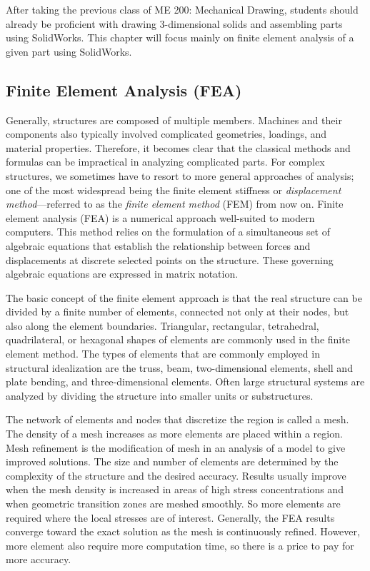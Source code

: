 \documentclass[a4paper,openany,nobib]{tufte-book}
\begin{document}
{{After taking the previous class of ME 200: Mechanical Drawing, students
should already be proficient with drawing 3-dimensional solids and
assembling parts using SolidWorks. This chapter will focus mainly on
finite element analysis of a given part using SolidWorks.

\subsection{Finite Element Analysis (FEA)}
\label{finite-element-analysis-fea}
Generally, structures are composed of multiple members. Machines and
their components also typically involved complicated geometries,
loadings, and material properties. Therefore, it becomes clear that the
classical methods and formulas can be impractical in analyzing
complicated parts. For complex structures, we sometimes have to resort
to more general approaches of analysis; one of the most widespread being
the finite element stiffness or \emph{displacement method}---referred to as
the \emph{finite element method} (FEM) from now on. Finite element analysis
(FEA) is a numerical approach well-suited to modern computers. This
method relies on the formulation of a simultaneous set of algebraic
equations that establish the relationship between forces and
displacements at discrete selected points on the structure. These
governing algebraic equations are expressed in matrix notation.

The basic concept of the finite element approach is that the real
structure can be divided by a finite number of elements, connected not
only at their nodes, but also along the element boundaries. Triangular,
rectangular, tetrahedral, quadrilateral, or hexagonal shapes of elements
are commonly used in the finite element method. The types of elements
that are commonly employed in structural idealization are the truss,
beam, two-dimensional elements, shell and plate bending, and
three-dimensional elements. Often large structural systems are analyzed
by dividing the structure into smaller units or substructures.

The network of elements and nodes that discretize the region is called a
mesh. The density of a mesh increases as more elements are placed within
a region. Mesh refinement is the modification of mesh in an analysis of
a model to give improved solutions. The size and number of elements are
determined by the complexity of the structure and the desired accuracy.
Results usually improve when the mesh density is increased in areas of
high stress concentrations and when geometric transition zones are
meshed smoothly. So more elements are required where the local stresses
are of interest. Generally, the FEA results converge toward the exact
solution as the mesh is continuously refined. However, more element also
require more computation time, so there is a price to pay for more
accuracy.

}}
\end{document}

